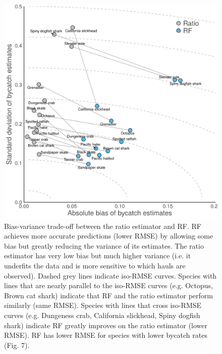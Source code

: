 \documentclass[]{article}
\begin{document}
\begin{figure}

{\centering \includegraphics[width=6in]{figures/fig7_tradeoffs_v2} 

}

\caption{Bias-variance trade-off between the ratio estimator and RF. RF achieves more accurate predictions (lower RMSE) by allowing some bias but greatly reducing the variance of its estimates. The ratio estimator has very low bias but much higher variance (i.e. it underfits the data and is more sensitive to which hauls are observed). Dashed grey lines indicate iso-RMSE curves. Species with lines that are nearly parallel to the iso-RMSE curves (e.g. Octopus, Brown cat shark) indicate that RF and the ratio estimator perform similarly (same RMSE). Species with lines that cross iso-RMSE curves (e.g. Dungeness crab, California slickhead, Spiny dogfish shark) indicate RF greatly improves on the ratio estimator (lower RMSE). RF has lower RMSE for species with lower bycatch rates (Fig. 7).}\label{fig:variance-bias}
\end{figure}
\end{document}
